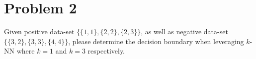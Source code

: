 \documentclass[11pt]{article}
\newcommand{\minimize}{\operatorname*{minimize\ }}
\newcommand{\answer}[2][blue]{\ifdefined\AnswerDefine{\color{#1}\it#2}\fi}
\newcommand{\mtx}[1]{\mathbf{#1}}
\def \mA {\mtx{A}}
\def \mG {\mtx{G}}
\def \mX {\mtx{X}}
\begin{document}
\section*{Problem 2}
Given positive data-set $\{\{1,1\},\{2,2\},\{2,3\}\}$, as well as negative data-set $\{\{3,2\},\{3,3\},\{4,4\}\}$, please determine the decision boundary when leveraging $k$-NN where $k=1$ and $k=3$ respectively.

\end{document}
